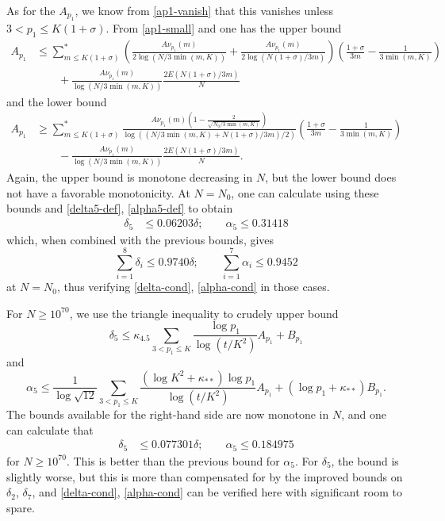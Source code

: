 \documentclass[10pt,a4paper,reqno]{amsart}
\numberwithin{equation}{section}
\theoremstyle{plain}
\theoremstyle{definition}
\begin{document}
As for the $A_{p_1}$, we know from \eqref{ap1-vanish} that this vanishes unless $3 < p_1 \leq K(1+\sigma)$.  From \eqref{ap1-small} and  one has the upper bound
\begin{align*}
A_{p_1} &\leq \sum_{m \leq K(1+\sigma)}^* \left(\frac{A \nu_{p_1}(m)}{2\log(N/3\min(m,K))} + \frac{A \nu_{p_1}(m)}{2\log(N(1+\sigma)/3m)} \right) \left( \frac{1+\sigma}{3m} - \frac{1}{3\min(m,K)}\right) \\
& \quad \quad + \frac{A \nu_{p_1}(m)}{\log(N/3\min(m,K))} \frac{2E(N(1+\sigma)/3m)}{N}
\end{align*}
and the lower bound
\begin{align*}
A_{p_1} &\geq \sum_{m \leq K(1+\sigma)}^* \frac{A \nu_{p_1}(m)\left(1-\frac{2}{\sqrt{N_0/3\min(m,K)}}\right) }{\log((N/3\min(m,K) + N(1+\sigma)/3m)/2)} \left(\frac{1+\sigma}{3m} - \frac{1}{3\min(m,K)}\right) \\
& \quad \quad - \frac{A \nu_{p_1}(m)}{\log(N/3\min(m,K))}  \frac{2E(N(1+\sigma)/3m)}{N}.
\end{align*}
Again, the upper bound is monotone decreasing in $N$, but the lower bound does not have a favorable monotonicity. At $N=N_0$, one can calculate using these bounds and \eqref{delta5-def}, \eqref{alpha5-def} to obtain
\begin{align*}
\delta_5 &\leq 0.06203 \delta; \qquad \alpha_5 \leq 0.31418
\end{align*}
which, when combined with the previous bounds, gives
$$ \sum_{i=1}^8 \delta_i  \leq 0.9740 \delta; \qquad \sum_{i=1}^7 \alpha_i \leq 0.9452$$
at $N=N_0$, thus verifying \eqref{delta-cond}, \eqref{alpha-cond} in those cases.

For $N \geq 10^{70}$, we use the triangle inequality to crudely upper bound
$$ \delta_5 \leq \kappa_{4.5} \sum_{3 < p_1 \leq K} \frac{\log p_1}{\log(t/K^2)} A_{p_1} + B_{p_1}$$
and
$$ \alpha_5 \leq \frac{1}{\log \sqrt{12}} \sum_{3 < p_1 \leq K}  \frac{(\log K^2+\kappa_{**})\log p_1}{\log(t/K^2)} A_{p_1} + (\log p_1 + \kappa_{**}) B_{p_1}.$$
The bounds available for the right-hand side are now monotone in $N$, and one can calculate that
\begin{align*}
  \delta_5 &\leq 0.077301 \delta; \qquad \alpha_5 \leq 0.184975
  \end{align*}
for $N \geq 10^{70}$. This is better than the previous bound for $\alpha_5$.  For $\delta_5$, the bound is slightly worse, but this is more than compensated for by the improved bounds on $\delta_2$, $\delta_7$, and \eqref{delta-cond}, \eqref{alpha-cond} can be verified here with significant room to spare.
\end{document}
